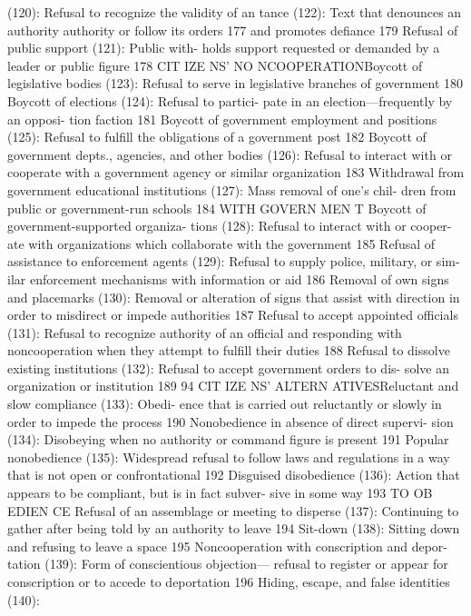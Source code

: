 \documentclass[twoside,a4paper,12pt,fleqn,openany]{extbook}
\begin{document}
(120): Refusal to recognize the validity of an
 tance (122): Text that denounces an authority
authority or follow its orders
 177
 and promotes defiance
 179
Refusal of public support (121): Public with-
holds support requested or demanded by a
leader or public figure
 178
CIT IZE NS’ NO NCOOPERATIONBoycott of legislative bodies (123): Refusal to
serve in legislative branches of government		
180
Boycott of elections (124): Refusal to partici-
pate in an election—frequently by an opposi-
tion faction
 181
Boycott of government employment and
positions (125): Refusal to fulfill the obligations
of a government post
 182
Boycott of government depts., agencies, and
other bodies (126): Refusal to interact with or
cooperate with a government agency or similar
organization
 183
Withdrawal from government educational
institutions (127): Mass removal of one’s chil-
dren from public or government-run schools		
184
WITH GOVERN MEN T
Boycott of government-supported organiza-
tions (128): Refusal to interact with or cooper-
ate with organizations which collaborate with
the government
 185
Refusal of assistance to enforcement agents
(129): Refusal to supply police, military, or sim-
ilar enforcement mechanisms with information
or aid
 186
Removal of own signs and placemarks (130):
Removal or alteration of signs that assist with
direction in order to misdirect or impede
authorities
 187
Refusal to accept appointed officials (131):
Refusal to recognize authority of an official and
responding with noncooperation when they
attempt to fulfill their duties
 188
Refusal to dissolve existing institutions (132):
Refusal to accept government orders to dis-
solve an organization or institution
 189
94
CIT IZE NS’ ALTERN ATIVESReluctant and slow compliance (133): Obedi-
ence that is carried out reluctantly or slowly in
order to impede the process
 190
Nonobedience in absence of direct supervi-
sion (134): Disobeying when no authority or
command figure is present
 191
Popular nonobedience (135): Widespread
refusal to follow laws and regulations in a way
that is not open or confrontational
 192
Disguised disobedience (136): Action that
appears to be compliant, but is in fact subver-
sive in some way
 193
TO OB EDIEN CE
Refusal of an assemblage or meeting to
disperse (137): Continuing to gather after being
told by an authority to leave
 194
Sit-down (138): Sitting down and refusing to
leave a space
 195
Noncooperation with conscription and depor-
tation (139): Form of conscientious objection—
refusal to register or appear for conscription or
to accede to deportation
 196
Hiding, escape, and false identities (140):
\end{document}
